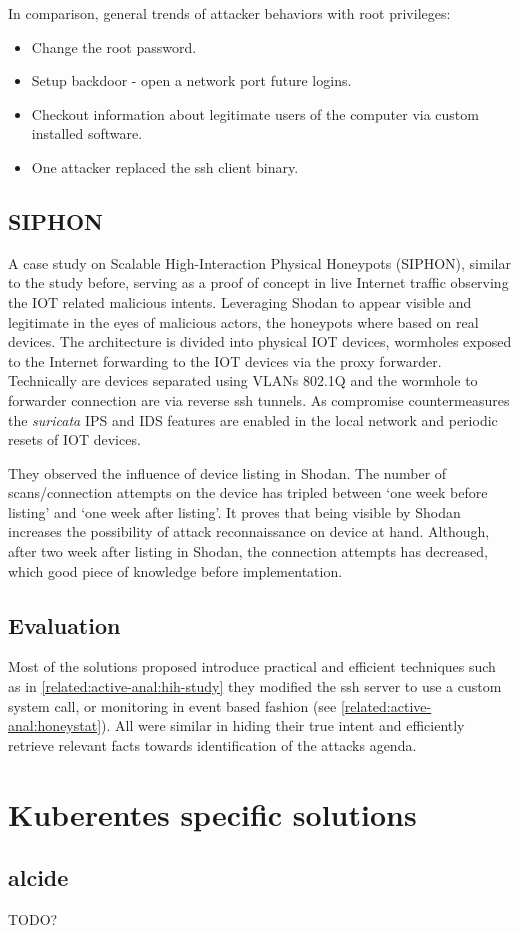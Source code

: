 In comparison, general trends of attacker behaviors with root privileges:
	
\begin{itemize}[noitemsep]
	\item Change the root password.
	\item Setup backdoor - open a network port future logins.
	\item Checkout information about legitimate users of the computer via custom installed software.
	\item One attacker replaced the ssh client binary.
\end{itemize}

\subsection{SIPHON \label{related:active-anal:siphon}}
A case study \cite{study:siphon} on Scalable High-Interaction Physical Honeypots (SIPHON), similar to the study before, serving as a proof of concept in live Internet traffic observing the IOT related malicious intents. Leveraging Shodan to appear visible and legitimate in the eyes of malicious actors, the honeypots where based on real devices. The architecture is divided into physical IOT devices, wormholes exposed to the Internet forwarding to the IOT devices via the proxy forwarder. Technically are devices separated using VLANs 802.1Q and the wormhole to forwarder connection are via reverse ssh tunnels. As compromise countermeasures the \textit{suricata} IPS and IDS features are enabled in the local network and periodic resets of IOT devices.

They observed the influence of device listing in Shodan. The number of scans/connection attempts on the device has tripled between `one week before listing' and `one week after listing'. It proves that being visible by Shodan increases the possibility of attack reconnaissance on device at hand. Although, after two week after listing in Shodan, the connection attempts has decreased, which good piece of knowledge before implementation.

\subsection{Evaluation}
Most of the solutions proposed introduce practical and efficient techniques such as in \autoref{related:active-anal:hih-study} they modified the ssh server to use a custom system call, or monitoring in event based fashion (see \autoref{related:active-anal:honeystat}). All were similar in hiding their true intent and efficiently retrieve relevant facts towards identification of the attacks agenda.

\section{Kuberentes specific solutions \label{related:k8s}}

\subsection{alcide \label{related:k8s:alcide}}
TODO?
